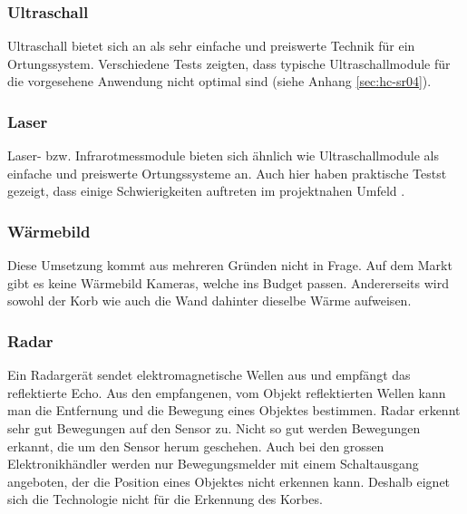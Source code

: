 \subsubsection{Ultraschall}
Ultraschall bietet sich an als sehr einfache und preiswerte Technik für ein Ortungssystem.
Verschiedene Tests zeigten, dass typische Ultraschallmodule für die vorgesehene Anwendung
nicht optimal sind (siehe Anhang \ref{sec:hc-sr04}).

\subsubsection{Laser}
Laser- bzw. Infrarotmessmodule bieten sich ähnlich wie Ultraschallmodule als einfache und
preiswerte Ortungssysteme an. Auch hier haben praktische Testst gezeigt, dass einige
Schwierigkeiten auftreten im projektnahen Umfeld \cite{wiki-laser}.

\subsubsection{Wärmebild}
Diese Umsetzung kommt aus mehreren Gründen nicht in Frage. Auf dem Markt gibt es keine Wärmebild Kameras, welche ins Budget passen. Andererseits wird sowohl der Korb wie auch die Wand dahinter dieselbe Wärme aufweisen.

\subsubsection{Radar}

Ein Radargerät sendet elektromagnetische Wellen aus und empfängt das reflektierte Echo. Aus den empfangenen, vom Objekt reflektierten Wellen kann man die Entfernung und die Bewegung eines Objektes bestimmen. Radar erkennt sehr gut Bewegungen auf den Sensor zu. Nicht so gut werden Bewegungen erkannt, die um den Sensor herum geschehen. Auch bei den grossen Elektronikhändler werden nur Bewegungsmelder mit einem Schaltausgang angeboten, der die Position eines Objektes nicht erkennen kann. Deshalb eignet sich die Technologie nicht für die Erkennung des Korbes.
